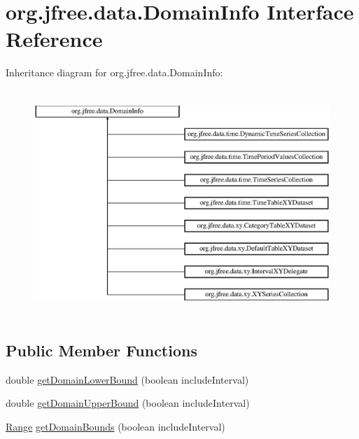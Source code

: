 \hypertarget{interfaceorg_1_1jfree_1_1data_1_1_domain_info}{}\section{org.\+jfree.\+data.\+Domain\+Info Interface Reference}
\label{interfaceorg_1_1jfree_1_1data_1_1_domain_info}
Inheritance diagram for org.\+jfree.\+data.\+Domain\+Info\+:\begin{figure}[H]
\begin{center}
\leavevmode
\includegraphics[height=8.571428cm]{interfaceorg_1_1jfree_1_1data_1_1_domain_info}
\end{center}
\end{figure}
\subsection*{Public Member Functions}
\begin{DoxyCompactItemize}
\item 
double \mbox{\hyperlink{interfaceorg_1_1jfree_1_1data_1_1_domain_info_ae1b4d9d415fe0a79bd2ce0f6e0a3f489}{get\+Domain\+Lower\+Bound}} (boolean include\+Interval)
\item 
double \mbox{\hyperlink{interfaceorg_1_1jfree_1_1data_1_1_domain_info_a00e455f8db5bd8515266000cacc74e89}{get\+Domain\+Upper\+Bound}} (boolean include\+Interval)
\item 
\mbox{\hyperlink{classorg_1_1jfree_1_1data_1_1_range}{Range}} \mbox{\hyperlink{interfaceorg_1_1jfree_1_1data_1_1_domain_info_aeb90c8bc6d27c82c39abc99622846732}{get\+Domain\+Bounds}} (boolean include\+Interval)
\end{DoxyCompactItemize}


